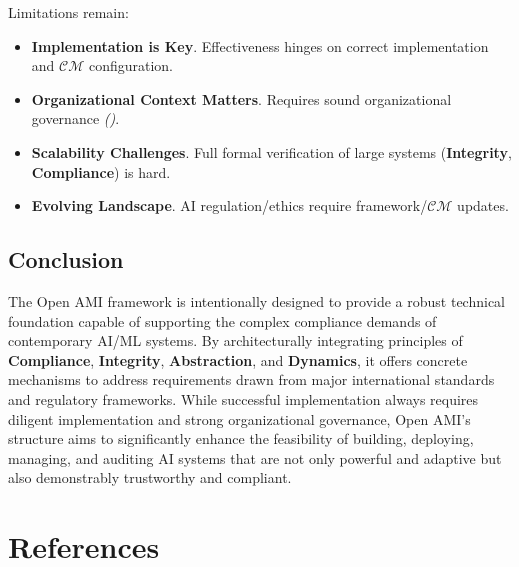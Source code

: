 \documentclass[12pt,a4paper]{report}
\renewcommand{\citep}[1]{\textit{\scriptsize{(\cite{#1})}}}
\newcommand{\Compliance}{\textbf{Compliance}}
\newcommand{\Integrity}{\textbf{Integrity}}
\newcommand{\Abstraction}{\textbf{Abstraction}}
\newcommand{\Dynamics}{\textbf{Dynamics}}
\begin{document}
	Limitations remain:
	\begin{itemize}
		\item \textbf{Implementation is Key}. Effectiveness hinges on correct implementation and $\mathcal{CM}$ configuration.
		\item \textbf{Organizational Context Matters}. Requires sound organizational governance \citep{Responsible_AI_Governance_Review_2024}.
		\item \textbf{Scalability Challenges}. Full formal verification of large systems (\Integrity, \Compliance) is hard.
		\item \textbf{Evolving Landscape}. AI regulation/ethics require framework/$\mathcal{CM}$ updates.
	\end{itemize}
	
	\section{Conclusion}
	\label{app:compmap_conclusion}
	
	The Open AMI framework is intentionally designed to provide a robust technical foundation capable of supporting the complex compliance demands of contemporary AI/ML systems. By architecturally integrating principles of \Compliance, \Integrity, \Abstraction, and \Dynamics, it offers concrete mechanisms to address requirements drawn from major international standards and regulatory frameworks. While successful implementation always requires diligent implementation and strong organizational governance, Open AMI's structure aims to significantly enhance the feasibility of building, deploying, managing, and auditing AI systems that are not only powerful and adaptive but also demonstrably trustworthy and compliant.
	
		\chapter{References}
	\label{ch:references}
	
	
	
	
\end{document}

